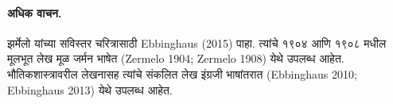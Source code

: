 \paragraph{अधिक वाचन.}
झर्मेलो यांच्या सविस्तर चरित्रासाठी Ebbinghaus (2015) पाहा. त्यांचे १९०४ आणि १९०८ मधील मूलभूत लेख मूळ जर्मन भाषेत (Zermelo 1904; Zermelo 1908) येथे उपलब्ध आहेत. भौतिकशास्त्रावरील लेखनासह त्यांचे संकलित लेख इंग्रजी भाषांतरात (Ebbinghaus 2010; Ebbinghaus 2013) येथे उपलब्ध आहेत.




